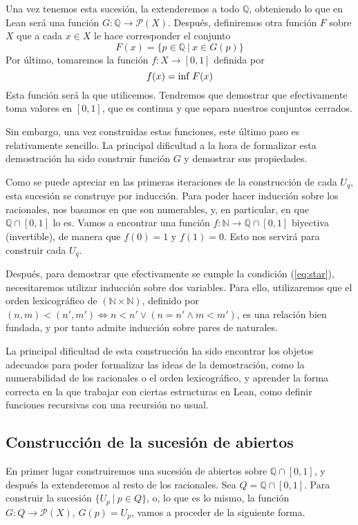 Una vez tenemos esta sucesión, la extenderemos a todo $\mathbb{Q}$, obteniendo lo que en Lean será una función $G : \mathbb{Q} \to \mathcal{P}(X)$. Después, definiremos otra función $F$ sobre $X$ que a cada $x \in X$ le hace corresponder el conjunto
$$
F(x) = \{p \in \mathbb{Q} ~|~ x \in G(p)\}
$$
Por último, tomaremos la función $f : X \to [0, 1]$ definida por
$$
f(x) = \textnormal{inf}~F(x)
$$
Esta función será la que utilicemos. Tendremos que demostrar que efectivamente toma valores en $[0, 1]$, que es continua y que separa nuestros conjuntos cerrados.

Sin embargo, una vez construidas estas funciones, este último paso es relativamente sencillo. La principal dificultad a la hora de formalizar esta demostración ha sido construir función $G$ y demostrar sus propiedades.

Como se puede apreciar en las primeras iteraciones de la construcción de cada $U_q$, esta sucesión se construye por inducción. Para poder hacer inducción sobre los racionales, nos basamos en que son numerables, y, en particular, en que $\mathbb{Q}\cap[0, 1]$ lo es. Vamos a encontrar una función $f : \mathbb{N} \to \mathbb{Q} \cap [0, 1]$ biyectiva (invertible), de manera que $f(0) = 1$ y $f(1) = 0$. Esto nos servirá para construir cada $U_q$.

Después, para demostrar que efectivamente se cumple la condición (\ref{eq:star}), necesitaremos utilizar inducción sobre dos variables. Para ello, utilizaremos que el orden lexicográfico de $(\mathbb{N} \times \mathbb{N})$, definido por $(n, m) < (n', m') \iff n<n' \lor (n=n' \land m<m')$, es una relación bien fundada, y por tanto admite inducción sobre pares de naturales.

La principal dificultad de esta construcción ha sido encontrar los objetos adecuados para poder formalizar las ideas de la demostración, como la numerabilidad de los racionales o el orden lexicográfico, y aprender la forma correcta en la que trabajar con ciertas estructuras en Lean, como definir funciones recursivas con una recursión no usual.

\subsection{Construcción de la sucesión de abiertos}

En primer lugar construiremos una sucesión de abiertos sobre $\mathbb{Q}\cap[0, 1]$, y después la extenderemos al resto de los racionales. Sea $Q = \mathbb{Q}\cap[0, 1]$. Para construir la sucesión $\{U_p ~|~ p \in Q\}$, o, lo que es lo mismo, la función $G : Q \to \mathcal{P}(X)$, $G(p) = U_p$, vamos a proceder de la siguiente forma.

